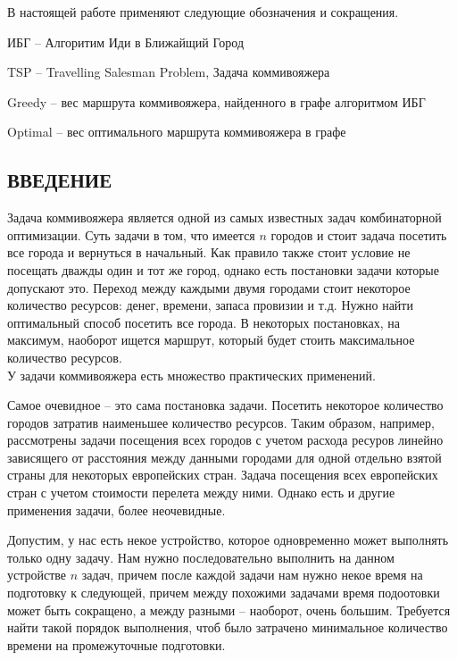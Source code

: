 \documentclass[a4paper, 14pt]{extarticle}
\numberwithin{equation}{section}
\begin{document}
В настоящей работе применяют следующие обозначения и сокращения.

ИБГ -- Алгоритим Иди в Ближайщий Город

TSP -- Travelling Salesman Problem, Задача коммивояжера

Greedy -- вес маршрута коммивояжера, найденного в графе алгоритмом ИБГ

Optimal -- вес оптимального маршрута коммивояжера в графе



\newpage

\begin{center}
\chapter{\textbf{ВВЕДЕНИЕ}}
\end{center}


Задача коммивояжера является одной из самых известных задач комбинаторной оптимизации. Суть задачи в том, что имеется $n$ городов и стоит задача посетить все города и вернуться в начальный. Как правило также стоит условие не посещать дважды один и тот же город, однако есть постановки задачи которые допускают это. Переход между каждыми двумя городами стоит некоторое количество ресурсов: денег, времени, запаса провизии и т.д. Нужно найти оптимальный способ посетить все города. В некоторых постановках, на максимум, наоборот ищется маршрут, который будет стоить максимальное количество ресурсов. \\


У задачи коммивояжера есть множество практических применений. 

Самое очевидное -- это сама постановка задачи. Посетить некоторое количество городов затратив наименьшее количество ресурсов. Таким образом, например, рассмотрены задачи посещения всех городов с учетом расхода ресуров линейно зависящего от расстояния между данными городами для одной отдельно взятой страны для некоторых европейских стран. Задача посещения всех европейских стран с учетом стоимости перелета между ними. Однако есть и другие применения задачи, более неочевидные.

Допустим, у нас есть некое устройство, которое одновременно может выполнять только одну задачу.  Нам нужно последовательно выполнить на данном устройстве $n$ задач, причем после каждой задачи нам нужно некое время на подготовку к следующей, причем между похожими задачами время подоотовки может быть сокращено, а между разными -- наоборот, очень большим. Требуется найти такой порядок выполнения, чтоб было затрачено минимальное количество времени на промежуточные подготовки.
\end{document}
